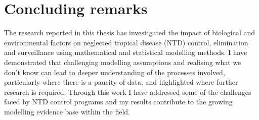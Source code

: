 \chapter*{Concluding remarks}

The research reported in this thesis has investigated the impact of biological and environmental factors on neglected tropical disease (NTD) control, elimination and surveillance using mathematical and statistical modelling methods. I have demonstrated that challenging modelling assumptions and realising what we don't know can lead to deeper understanding of the processes involved, particularly where there is a paucity of data, and highlighted where further research is required. Through this work I have addressed some of the challenges faced by NTD control programs and my results contribute to the growing modelling evidence base within the field.